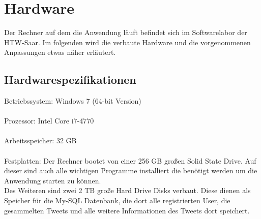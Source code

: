 \section{Hardware}
Der Rechner auf dem die Anwendung läuft befindet sich im Softwarelabor der HTW-Saar. Im folgenden wird die verbaute Hardware und die vorgenommenen Anpassungen etwas näher erläutert.
\subsection{Hardwarespezifikationen}
Betriebssystem: Windows 7 (64-bit Version)
\\\\
Prozessor: Intel Core i7-4770
\\\\
Arbeitsspeicher: 32 GB
\\\\
Festplatten: Der Rechner bootet von einer 256 GB großen Solid State Drive. Auf dieser sind auch alle wichtigen Programme installiert die benötigt werden um die Anwendung starten zu können.
\\
Des Weiteren sind zwei 2 TB große Hard Drive Disks verbaut. Diese dienen als Speicher für die My-SQL Datenbank, die dort alle registrierten User, die gesammelten Tweets und alle weitere Informationen des Tweets dort speichert.

